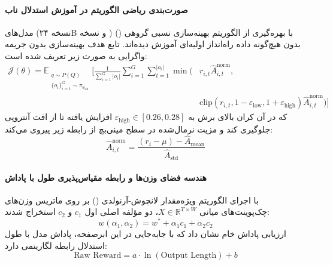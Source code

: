 \item {}

\paragraph*{صورت‌بندی ریاضی الگوریتم  در آموزش استدلال ناب}
مدل‌های  \cite{magistral2025} (نسخه ۲۴B و نسخه ) با بهره‌گیری از الگوریتم بهینه‌سازی نسبی گروهی () \cite{shao2024deepseekmath} بدون هیچ‌گونه داده راه‌انداز اولیه‌ای آموزش دیده‌اند. تابع هدف بهینه‌سازی بدون جریمه واگرایی  به صورت زیر تعریف شده است:
\begin{equation}
\begin{aligned}
    \mathcal{J}(\theta) = \mathbb{E}_{\substack{q \sim P(Q) \\ \{o_i\}_{i=1}^G \sim \pi_{\theta_{\text{old}}}}} \Bigg[ \frac{1}{\sum_{i=1}^G |o_i|} \sum_{i=1}^G \sum_{t=1}^{|o_i|} \min \Big( & r_{i,t} \hat{A}^{\text{norm}}_{i,t}, \\
    & \text{clip}(r_{i,t}, 1 - \varepsilon_{\text{low}}, 1 + \varepsilon_{\text{high}}) \hat{A}^{\text{norm}}_{i,t} \Big) \Bigg]
\end{aligned}
\end{equation}
که در آن کران بالای برش به $\varepsilon_{\text{high}} \in [0.26, 0.28]$ افزایش یافته تا از افت آنتروپی جلوگیری کند و مزیت نرمال‌شده در سطح مینی‌بچ از رابطه زیر پیروی می‌کند:
\begin{equation}
    \hat{A}^{\text{norm}}_{i,t} = \frac{(r_i - \mu) - \hat{A}_{\text{mean}}}{\hat{A}_{\text{std}}}
\end{equation}

\paragraph*{هندسه فضای وزن‌ها و رابطه مقیاس‌پذیری طول با پاداش}
با اجرای الگوریتم ویژه‌مقدار لانچوش-آرنولدی () بر روی ماتریس وزن‌های چک‌پوینت‌های میانی $X \in \mathbb{R}^{T \times W}$، دو مؤلفه اصلی اول $c_1$ و $c_2$ استخراج شدند:
\begin{equation}
    w(\alpha_1, \alpha_2) = w^* + \alpha_1 c_1 + \alpha_2 c_2
\end{equation}
ارزیابی پاداش خام نشان داد که با جابه‌جایی در این ابرصفحه، پاداش مدل با طول استدلال رابطه لگاریتمی دارد:
\begin{equation}
    \text{Raw Reward} = a \cdot \ln(\text{Output Length}) + b
\end{equation}

